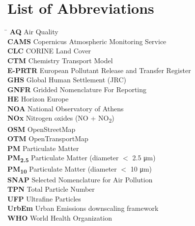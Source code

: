 \documentclass[11pt, a4paper, twoside, openright]{report}
\begin{document}
\chapter*{List of Abbreviations}
\begin{tabbing}
  \hspace{3cm} \= \kill
  \textbf{AQ}     \> Air Quality \\
  \textbf{CAMS}   \> Copernicus Atmospheric Monitoring Service \\
  \textbf{CLC}    \> CORINE Land Cover \\
  \textbf{CTM}    \> Chemistry Transport Model \\
  \textbf{E-PRTR} \> European Pollutant Release and Transfer Register \\
  \textbf{GHS}    \> Global Human Settlement (JRC) \\
  \textbf{GNFR}   \> Gridded Nomenclature For Reporting \\
  \textbf{HE}     \> Horizon Europe \\
  \textbf{NOA}    \> National Observatory of Athens \\
  \textbf{NOx}    \> Nitrogen oxides (NO + NO\textsubscript{2}) \\
  \textbf{OSM}    \> OpenStreetMap \\
  \textbf{OTM}    \> OpenTransportMap \\
  \textbf{PM}     \> Particulate Matter \\
  \textbf{PM\textsubscript{2.5}} \> Particulate Matter (diameter $<$ 2.5 \si{\micro\metre}) \\
  \textbf{PM\textsubscript{10}}  \> Particulate Matter (diameter $<$ 10 \si{\micro\metre}) \\
  \textbf{SNAP}   \> Selected Nomenclature for Air Pollution \\
  \textbf{TPN}    \> Total Particle Number \\
  \textbf{UFP}    \> Ultrafine Particles \\
  \textbf{UrbEm}  \> Urban Emissions downscaling framework \\
  \textbf{WHO}    \> World Health Organization \\
\end{tabbing}

\cleardoublepage
{}
\setcounter{page}{1}
\pagestyle{fancy}










\cleardoublepage
{}


\appendix




\end{document}
